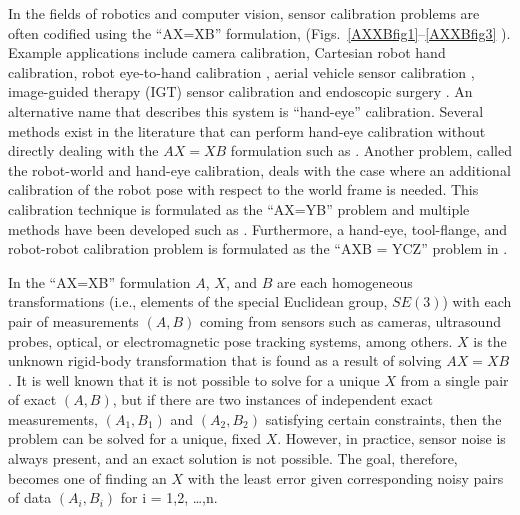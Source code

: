 \documentclass[twocolumn,10pt]{asme2ej}
\begin{document}
In the fields of robotics and computer vision, sensor calibration problems are often codified using the ``AX=XB'' formulation, (Figs.~\ref{AXXBfig1}--\ref{AXXBfig3}%
). Example applications include camera calibration, Cartesian robot hand calibration, robot eye-to-hand calibration \cite{tsai1989new}, aerial vehicle sensor calibration \cite{darius1}, image-guided therapy (IGT) sensor calibration and endoscopic surgery \cite{schmidt2003robust}. An alternative name that describes this system is ``hand-eye'' calibration. Several methods exist %
in the literature that can perform hand-eye calibration without directly dealing with the $AX=XB$ formulation such as \cite{malm2000new,heller2012branch,ruland2012globally,wu2014hand,kim,liu2015calibration}. %
Another problem, called the robot-world and hand-eye calibration, deals with the case where an additional calibration of the robot pose with respect to the world frame is needed. This calibration technique is formulated as the ``AX=YB'' problem and multiple methods have been developed %
such as \cite{zhuang1994simultaneous,dornaika1998simultaneous,hirsh2001iterative,li2010simultaneous,ernst2012non,heller2014hand}.
Furthermore, a hand-eye, tool-flange, and robot-robot calibration problem is formulated as the ``AXB = YCZ'' problem in \cite{wang2014towards}.

In the ``AX=XB'' formulation $A$, $X$, and $B$ are each homogeneous transformations (i.e., elements of the special Euclidean group, $SE(3)$) with each pair of measurements $(A,B)$ coming from sensors such as cameras, ultrasound probes, optical, or electromagnetic pose tracking systems, among others. $X$ is the unknown rigid-body transformation %
that is found as a result of solving $AX=XB$. It is well known that it is not possible to solve for
a unique $X$ from a single pair of exact $(A,B)$, but if there are two instances of independent exact measurements, $(A_1,B_1)$ and $(A_2,B_2)$ satisfying certain constraints,
then the problem can be solved for a unique, fixed $X$. However, in practice, sensor noise is always present, and an exact solution is not possible. The goal, therefore, becomes one of finding
an $X$ with the least error given corresponding noisy pairs of data $(A_i, B_i)$ for i = 1,2, \ldots,n.
\end{document}

